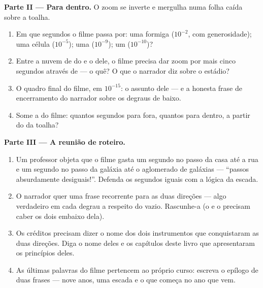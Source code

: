\begin{problem}
\medskip\noindent\textbf{Parte II --- Para dentro.}
O zoom se inverte e mergulha numa folha caída sobre a toalha.
\begin{enumerate}[resume]
  \item Em que segundos o filme passa por: uma formiga ($10^{-2}$,
        com generosidade); uma célula ($10^{-5}$); uma 
        ($10^{-9}$); um  ($10^{-10}$)?
  \item Entre a nuvem de  do  e o  dele, o filme
        precisa dar zoom por mais cinco segundos através de --- o
        quê? O que o narrador diz sobre o estádio?
  \item O quadro final do filme, em $10^{-15}$: o assunto dele --- e
        a honesta frase de encerramento do narrador sobre os degraus
        de baixo.
  \item Some a  do filme: quantos segundos para fora, quantos
        para dentro, a partir do  da toalha?
\end{enumerate}

\medskip\noindent\textbf{Parte III --- A reunião de roteiro.}
\begin{enumerate}[resume]
  \item Um professor objeta que o filme gasta um segundo no passo da
        casa até a rua e um segundo no passo da galáxia até o
        aglomerado de galáxias --- ``passos absurdamente desiguais!''.
        Defenda os segundos iguais com a lógica da escada.
  \item O narrador quer uma frase recorrente para as duas direções
        --- algo verdadeiro em cada degrau a respeito do vazio.
        Rascunhe-a (o  e o  precisam caber os dois
        embaixo dela).
  \item Os créditos precisam dizer o nome dos dois instrumentos que
        conquistaram as duas direções. Diga o nome deles e os
        capítulos deste livro que apresentaram os princípios deles.
  \item As últimas palavras do filme pertencem ao próprio curso:
        escreva o epílogo de duas frases --- nove anos, uma escada e
        o que começa no ano que vem.
\end{enumerate}
\end{problem}
